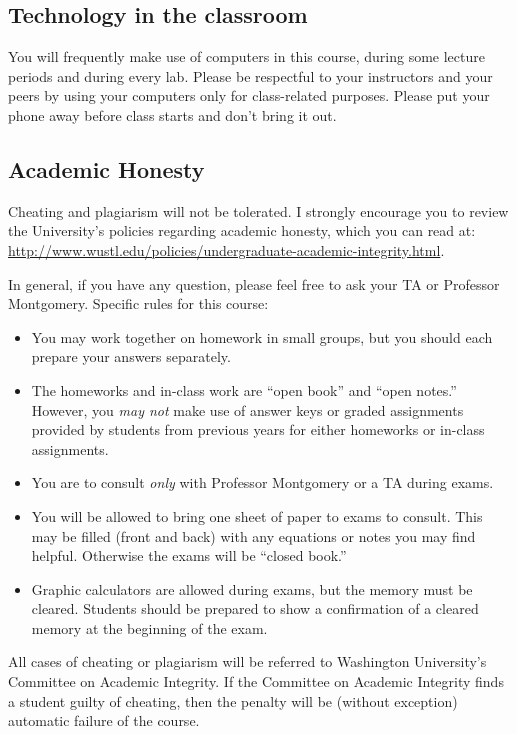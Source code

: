 \documentclass[11pt]{article}
\begin{document}
\subsection*{Technology in the classroom}

You will frequently make use of computers in this course, during some
lecture periods and during every lab.  Please be respectful to your
instructors and your peers by using your computers only for
class-related purposes.  Please put your phone away before class starts and
don't bring it out.

\subsection*{Academic Honesty} 

Cheating and plagiarism will not be tolerated.  I strongly encourage
you to review the University's policies regarding academic honesty,
which you can read at:
\url{http://www.wustl.edu/policies/undergraduate-academic-integrity.html}.

In general, if you have any question, please feel free to ask
your TA or Professor Montgomery. Specific rules for this course:
\begin{itemize}
\item You may work together on homework in small groups, but you
  should each prepare your answers separately.
\item The homeworks and in-class work are ``open book'' and ``open
  notes.''  However, you \textit{may not} make use of answer keys or
  graded assignments provided by students from previous years for
  either homeworks or in-class assignments.
\item You are to consult \textit{only} with Professor Montgomery or
  a TA during exams.
\item You will be allowed to bring one sheet of paper to exams to
  consult.  This may be filled (front and back) with any equations or
  notes you may find helpful.  Otherwise the exams will be ``closed
  book.''
\item Graphic calculators are allowed during exams, but the memory
  must be cleared. Students should be prepared to show a confirmation
  of a cleared memory at the beginning of the exam.
\end{itemize}

\noindent All cases of cheating or plagiarism will be referred to Washington
University's Committee on Academic Integrity. If the Committee on
Academic Integrity finds a student guilty of cheating, then the
penalty will be (without exception) automatic failure of the course.
\end{document}
